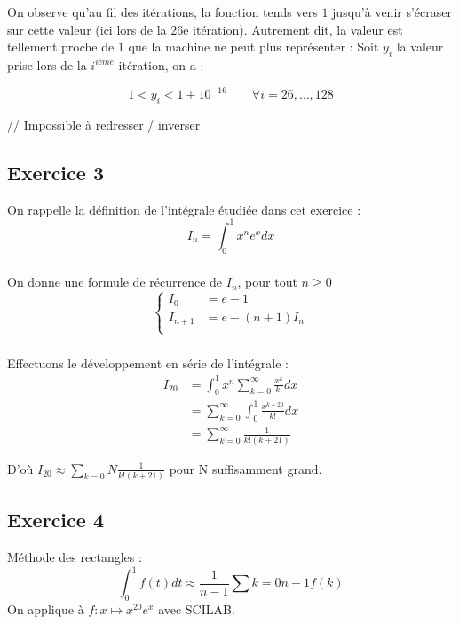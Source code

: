 \documentclass[a4paper,12pt]{article}
\begin{document}
On observe qu'au fil des itérations, la fonction tends vers $1$ jusqu'à venir s'écraser sur cette valeur (ici lors de la 26e itération). Autrement dit, la valeur est tellement proche de $1$ que la machine ne peut plus représenter : Soit $y_i$ la valeur prise lors de la $i^{ième}$ itération, on a :

$$ 
1 < y_i < 1 + 10^{-16} \qquad \forall i = 26,\dots,128
$$

// Impossible à redresser / inverser


\subsection{ Exercice 3}
On rappelle la définition de l'intégrale étudiée dans cet exercice : 
$$
I_n=\int _0^1x^ne^xdx
$$
\subsubsection{}

On donne une formule de récurrence de $I_n$, pour tout $n \geq 0$
$$
  \left\{ \begin{aligned}
    I_0&=e-1\\
    I_{n+1}&=e-(n+1)I_n\\
  \end{aligned} \right.
$$

\subsubsection{}
Effectuons le développement en série de l'intégrale :
\begin{align*}
  I_{20}
  &=\int_0^1 x^n \sum_{k=0}^ \infty \frac{x^k}{k!}dx\\
  &=\sum_{k=0}^\infty \int_0^1\frac{x^{k+20}}{k!}dx\\
  &=\sum_{k=0}^\infty\frac{1}{k!(k+21)}
\end{align*}\newline

D'où $I_{20}\approx \sum_{k=0}{N}\frac{1}{k!(k+21)}$ pour N suffisamment grand.

\subsection{Exercice 4}

Méthode des rectangles :\newline
$$
\int_0^1f(t)dt\approx\frac{1}{n-1}\sum{k=0}{n-1}f(k)
$$
\newline
On applique à $f:x\mapsto x^{20}e^x$ avec SCILAB.
\end{document}
